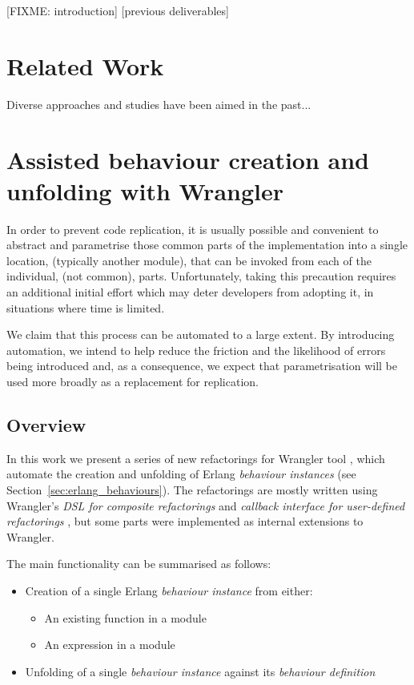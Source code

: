 [FIXME: introduction]
[previous deliverables]

\section{Related Work}
\label{related_work}

Diverse approaches and studies have been aimed in the past...

\section{Assisted behaviour creation and unfolding with Wrangler}

In order to prevent code replication, it is usually possible and
convenient to abstract and parametrise those common parts of the implementation
into a single location, (typically another module), that can be invoked
from each of the individual, (not common), parts. Unfortunately, taking
this precaution requires an additional initial effort which may deter
developers from adopting it, in situations where time is limited.

We claim that this process can be automated to a large extent. By
introducing automation, we intend to help reduce the friction and
the likelihood of errors being introduced and, as a consequence, we
expect that parametrisation will be used more broadly as a replacement
for replication.

\subsection{Overview}

In this work we present a series of new refactorings for Wrangler tool
\cite{li2008refactoring}, which automate the creation and unfolding of Erlang
\emph{behaviour instances} (see Section~\ref{sec:erlang_behaviours}).
The refactorings are mostly written using Wrangler's \emph{DSL for composite
refactorings} \cite{li2012domain} and \emph{callback interface for
user-defined refactorings} \cite{li2011user}, but some parts were implemented
as internal extensions to Wrangler.

The main functionality can be summarised as follows:
\begin{itemize}
\item Creation of a single Erlang \emph{behaviour instance} from either:

\begin{itemize}
\item An existing function in a module
\item An expression in a module
\end{itemize}
\item Unfolding of a single \emph{behaviour instance} against its \emph{behaviour
definition}
\end{itemize}


